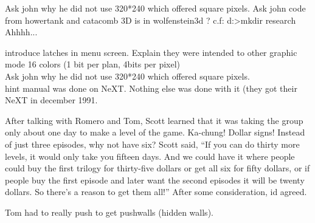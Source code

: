 \documentclass[8pt]{book}
\begin{document}
Ask john why he did not use 320*240 which offered square pixels.
Ask john code from howertank and catacomb 3D is in wolfenstein3d ? c.f: d:>mkdir research Ahhhh...

introduce latches in menu screen. Explain they were intended to other graphic mode 16 colors (1 bit per plan, 4bits per pixel)\\
Ask john why he did not use 320*240 which offered square pixels.\\

hint manual was done on NeXT. Nothing else was done with it (they got their NeXT in december 1991.\\
\par
After talking with Romero and Tom, Scott learned that it was taking the group only about one day to make a level of the game. Ka-chung! Dollar signs! Instead of just three episodes, why not have six? Scott said, “If you can do thirty more levels, it would only take you fifteen days. And we could have it where people could buy the first trilogy for thirty-five dollars or get all six for fifty dollars, or if people buy the first episode and later want the second episodes it will be twenty dollars. So there’s a reason to get them all!” After some consideration, id agreed.\\
\par


Tom had to really push to get pushwalls (hidden walls).


\end{document}
